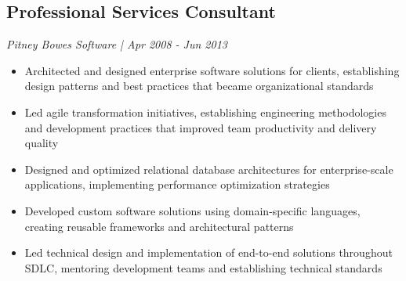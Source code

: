 %
%
\subsection{Professional Services Consultant}
\textit{Pitney Bowes Software | Apr 2008 - Jun 2013}
\begin{itemize}
	\item Architected and designed enterprise software solutions for clients, establishing design patterns and best practices that became organizational standards
	\item Led agile transformation initiatives, establishing engineering methodologies and development practices that improved team productivity and delivery quality
	\item Designed and optimized relational database architectures for enterprise-scale applications, implementing performance optimization strategies
	\item Developed custom software solutions using domain-specific languages, creating reusable frameworks and architectural patterns
	\item Led technical design and implementation of end-to-end solutions throughout SDLC, mentoring development teams and establishing technical standards
\end{itemize}

